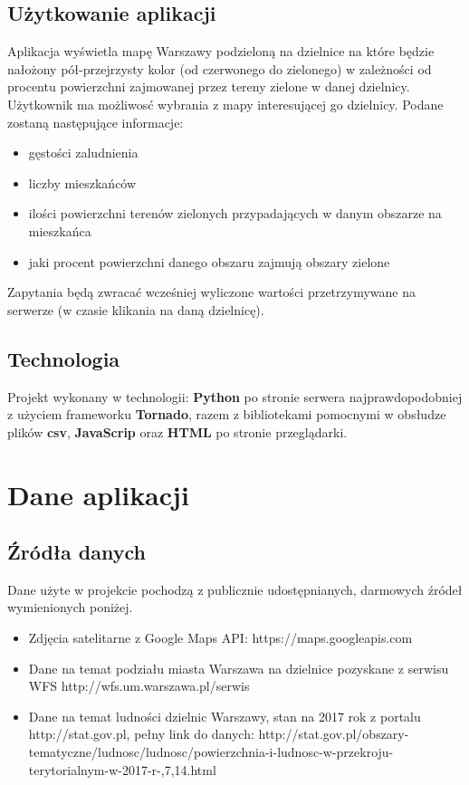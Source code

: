 \documentclass[11pt]{article}
\begin{document}
	\subsection{Użytkowanie aplikacji}
		Aplikacja wyświetla mapę Warszawy podzieloną na dzielnice na które będzie nałożony pół-przejrzysty kolor (od czerwonego do zielonego) w zależności od procentu powierzchni zajmowanej przez tereny zielone w danej dzielnicy. Użytkownik ma możliwosć wybrania z mapy interesującej go dzielnicy. Podane zostaną następujące informacje:
    \begin{itemize}
      \item gęstości zaludnienia
      \item liczby mieszkańców  
      \item ilości powierzchni terenów zielonych przypadających w danym obszarze na mieszkańca
      \item jaki procent powierzchni danego obszaru zajmują obszary zielone
    \end{itemize}
Zapytania będą zwracać wcześniej wyliczone wartości przetrzymywane na serwerze (w czasie klikania na daną dzielnicę). 


	\subsection{Technologia}
		Projekt wykonany w technologii: \textbf{Python} po stronie serwera najprawdopodobniej z użyciem frameworku \textbf{Tornado}, razem z bibliotekami pomocnymi w obsłudze plików \textbf{csv}, \textbf{JavaScrip} oraz \textbf{HTML} po stronie przeglądarki.  

	
	\section{Dane aplikacji}
	\subsection{Źródła danych}
		Dane użyte w projekcie pochodzą z publicznie udostępnianych, darmowych źródeł wymienionych poniżej.
	
	\begin{itemize}
	\item Zdjęcia satelitarne z Google Maps API: https://maps.googleapis.com
	\item Dane na temat podziału miasta Warszawa na dzielnice pozyskane z serwisu WFS http://wfs.um.warszawa.pl/serwis
	\item Dane na temat ludności dzielnic Warszawy, stan na 2017 rok z portalu http://stat.gov.pl, pełny link do danych: http://stat.gov.pl/obszary-tematyczne/ludnosc/ludnosc/powierzchnia-i-ludnosc-w-przekroju-terytorialnym-w-2017-r-,7,14.html
	\end{itemize}
\end{document}
